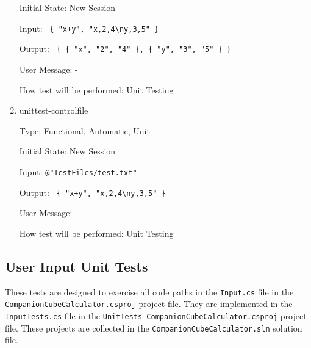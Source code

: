 \documentclass[12pt, titlepage]{article}
\begin{document}
\begin{enumerate}
	Initial State: New Session
	
	Input: \texttt{ \{ "x+y", "x,2,4\textbackslash ny,3,5" \} }
	
	Output: \texttt{ \{ \{ "x", "2", "4" \}, \{ "y", "3", "5" \} \}}
	
	User Message: -
	
	How test will be performed: Unit Testing\\
	
	\item{unittest-controlfile}
	
	Type: Functional, Automatic, Unit
	
	Initial State: New Session
	
	Input: \texttt{@"TestFiles/test.txt"}
	
	Output: \texttt{ \{ "x+y", "x,2,4\textbackslash ny,3,5" \} }
	
	User Message: -
	
	How test will be performed: Unit Testing\\
	
\end{enumerate}

\subsection{User Input Unit Tests}
These tests are designed to exercise all code paths in the \texttt{Input.cs} 
file in the \texttt{CompanionCubeCalculator.csproj} project file. They are 
implemented in the \texttt{InputTests.cs} file in the 
\texttt{UnitTests\_CompanionCubeCalculator.csproj} project file. These projects 
are collected in the \texttt{CompanionCubeCalculator.sln} solution file.
\end{document}
